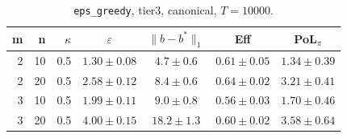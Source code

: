 \begin{table}[htbp]
\centering
\scriptsize
\caption{\texttt{eps\_greedy}, tier3, canonical, $T=10000$.}
\label{tab:tier3_long_eps_greedy}
\begin{tabular}{@{}rrrcccc@{}}
\toprule
m & n & $\kappa$ & $\varepsilon$ & $\|b-b^*\|_1$ & Eff & PoL$_\pi$ \\
\midrule
2 & 10 & 0.5 & $1.30 \pm 0.08$ & $4.7 \pm 0.6$ & $0.61 \pm 0.05$ & $1.34 \pm 0.39$ \\
2 & 20 & 0.5 & $2.58 \pm 0.12$ & $8.4 \pm 0.6$ & $0.64 \pm 0.02$ & $3.21 \pm 0.41$ \\
\midrule
3 & 10 & 0.5 & $1.99 \pm 0.11$ & $9.0 \pm 0.8$ & $0.56 \pm 0.03$ & $1.70 \pm 0.46$ \\
3 & 20 & 0.5 & $4.00 \pm 0.15$ & $18.2 \pm 1.3$ & $0.60 \pm 0.02$ & $3.58 \pm 0.64$ \\
\bottomrule
\end{tabular}
\end{table}
